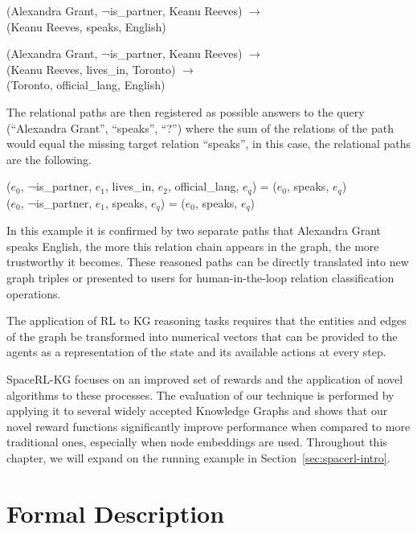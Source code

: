 \begin{center}
(Alexandra Grant, ¬is\_partner, Keanu Reeves) $\rightarrow$ \\
(Keanu Reeves, speaks, English) 
\end{center}

\begin{center}
(Alexandra Grant, ¬is\_partner, Keanu Reeves) $\rightarrow$ \\
(Keanu Reeves, lives\_in, Toronto) $\rightarrow$ \\
(Toronto, official\_lang, English)
\end{center}

The relational paths are then registered as possible answers to the query (``Alexandra Grant'', ``speaks'', ``?'') where the sum of the relations of the path would equal the missing target relation ``speaks'', in this case, the relational paths are the following.

\begin{center}
    ($e_0$, ¬is\_partner, $e_1$, lives\_in, $e_2$, official\_lang, $e_q$) = ($e_0$, speaks, $e_q$)\\
    ($e_0$, ¬is\_partner, $e_1$, speaks, $e_q$) = ($e_0$, speaks, $e_q$)
\end{center}

In this example it is confirmed by two separate paths that Alexandra Grant speaks English, the more this relation chain appears in the graph, the more trustworthy it becomes. These reasoned paths can be directly translated into new graph triples or presented to users for human-in-the-loop relation classification operations.

The application of RL to KG reasoning tasks requires that the entities and edges of the graph be transformed into numerical vectors that can be provided to the agents as a representation of the state and its available actions at every step.

SpaceRL-KG focuses on an improved set of rewards and the application of novel algorithms to these processes. The evaluation of our technique is performed by applying it to several widely accepted Knowledge Graphs and shows that our novel reward functions significantly improve performance when compared to more traditional ones, especially when node embeddings are used.
Throughout this chapter, we will expand on the running example in Section~\ref{sec:spacerl-intro}.

\section{Formal Description}\label{sec:spacerl-formal_description}

